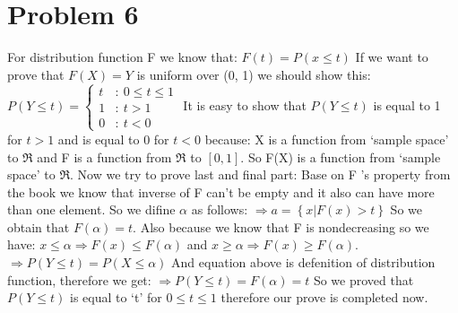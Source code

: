 \documentclass[12pt]{article}
\begin{document}
    \section*{Problem 6} For
    distribution function F we know that: \newline \newline $F(t)=P(x\le t)$
    \newline \newline If we want to prove that $F(X)=Y$ is uniform over (0, 1) we
    should show this:\newline \newline $P(Y\le t) = \left\{ \begin{array}{cl}
    t & : \ 0\le t \le 1 \\
    1 & : \ t > 1        \\
    0 & : \ t < 0
\end{array} \right.$
    \newline \newline \newline It is easy to show that $P(Y\le t)$ is equal to 1 for $t>1$ and is equal to 0 for $t<0$ because:\newline
    \newline X is a function from `sample space' to $\Re$ and F is a function from $\Re$ to $[0,1]$.
    \newline So F(X) is a function from `sample space' to $\Re$.
    \newline \newline Now we try to prove last and final part:
    \newline Base on F 's property from the book we know that inverse of F can't be empty and it also can have more than one element.
    \newline So we difine $\alpha$ as follows:\newline
$\Rightarrow a=\left\{ x | F(x)>t \right\} $
    \newline \newline So we obtain that $F(\alpha)=t$. Also because we know that F is nondecreasing so we have:
    \newline $x\le \alpha \Rightarrow F(x)\le F(\alpha)$ and $x\ge  \alpha \Rightarrow F(x)\ge  F(\alpha)$.
    \newline \newline $\Rightarrow P(Y\le t) = P(X\le \alpha)$
    \newline \newline And equation above is defenition of distribution function, therefore we get:
    \newline \newline $\Rightarrow P(Y\le t) = F(\alpha)=t$
    \newline \newline So we proved that $P(Y\le t)$ is equal to `t' for $0\le t \le 1$ therefore our prove is completed now.
\end{document}
